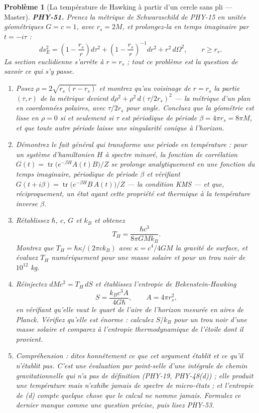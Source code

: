 \documentclass[11pt]{article}
\newtheorem{problem}{Problème}
\begin{document}
\begin{problem}[{La température de Hawking à partir d'un cercle sans pli --- Master}]
\textbf{PHY-51.} Prenez la métrique de Schwarzschild de PHY-15 en unités géométriques
$G = c = 1$, avec $r_s = 2M$, et prolongez-la en temps imaginaire par $t = -i\tau$ :
\[ ds_E^{2} = \left(1-\frac{r_s}{r}\right)d\tau^{2}
+ \left(1-\frac{r_s}{r}\right)^{-1}dr^{2} + r^{2}\,d\Omega^{2}, \qquad r \ge r_s. \]
La section euclidienne s'arrête à $r = r_s$ ; tout ce problème est la question de savoir ce qui
s'y passe.
\begin{enumerate}
\item[(a)] Posez $\rho = 2\sqrt{r_s\,(r-r_s)}$ et montrez qu'au voisinage de $r = r_s$ la partie
$(\tau,r)$ de la métrique devient $d\rho^{2} + \rho^{2}\,d\!\left(\tau/2r_s\right)^{2}$ --- la
métrique d'un plan en coordonnées polaires, avec $\tau/2r_s$ pour angle. Concluez que la
géométrie est lisse en $\rho = 0$ si et seulement si $\tau$ est périodique de période
$\beta = 4\pi r_s = 8\pi M$, et que toute autre période laisse une singularité conique à
l'horizon.
\item[(b)] Démontrez le fait général qui transforme une période en température : pour un système
d'hamiltonien $H$ à spectre minoré, la fonction de corrélation
$G(t) = \operatorname{tr}\bigl(e^{-\beta H}A(t)B\bigr)/Z$ se prolonge analytiquement en une
fonction du temps imaginaire, périodique de période $\beta$ et vérifiant
$G(t+i\beta) = \operatorname{tr}\bigl(e^{-\beta H}B\,A(t)\bigr)/Z$ --- la condition KMS --- et que,
réciproquement, un état ayant cette propriété est thermique à la température inverse
$\beta$.
\item[(c)] Rétablissez $\hbar$, $c$, $G$ et $k_B$ et obtenez
\[ T_H = \frac{\hbar c^{3}}{8\pi G M k_B}. \]
Montrez que $T_H = \hbar\kappa/(2\pi c k_B)$ avec $\kappa = c^{4}/4GM$ la gravité de surface,
et évaluez $T_H$ numériquement pour une masse solaire et pour un trou noir de $10^{12}$ kg.
\item[(d)] Réinjectez $dM c^{2} = T_H\,dS$ et établissez l'entropie de Bekenstein-Hawking
\[ S = \frac{k_B c^{3}A}{4G\hbar}, \qquad A = 4\pi r_s^{2}, \]
en vérifiant qu'elle vaut le quart de l'aire de l'horizon mesurée en aires de Planck. Vérifiez
qu'elle est énorme : calculez $S/k_B$ pour un trou noir d'une masse solaire et comparez à
l'entropie thermodynamique de l'étoile dont il provient.
\item[(e)] Compréhension : dites honnêtement ce que cet argument établit et ce qu'il n'établit pas. C'est
une évaluation par point-selle d'une intégrale de chemin gravitationnelle qui n'a pas de
définition (PHY-19, PHY-48(d)) ; elle produit une température mais n'exhibe jamais de spectre de
micro-états ; et l'entropie de (d) compte quelque chose que le calcul ne nomme jamais. Formulez ce
dernier manque comme une question précise, puis lisez PHY-53.
\end{enumerate}

\end{problem}
\end{document}
